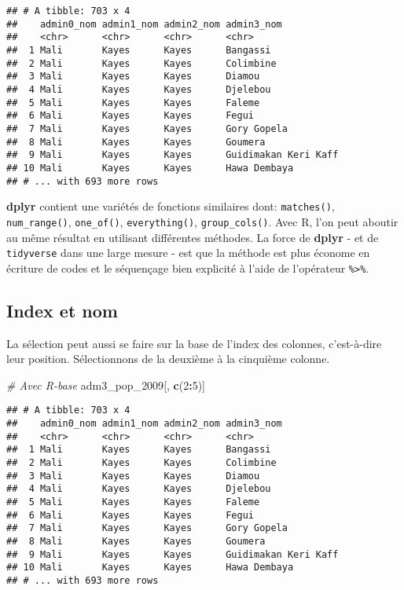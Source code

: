 \documentclass[]{book}
\newenvironment{Shaded}{\begin{snugshade}}{\end{snugshade}}
\newcommand{\KeywordTok}[1]{\textcolor[rgb]{0.13,0.29,0.53}{\textbf{#1}}}
\newcommand{\DecValTok}[1]{\textcolor[rgb]{0.00,0.00,0.81}{#1}}
\newcommand{\CommentTok}[1]{\textcolor[rgb]{0.56,0.35,0.01}{\textit{#1}}}
\newcommand{\OperatorTok}[1]{\textcolor[rgb]{0.81,0.36,0.00}{\textbf{#1}}}
\newcommand{\NormalTok}[1]{#1}
\begin{document}
\begin{verbatim}
## # A tibble: 703 x 4
##    admin0_nom admin1_nom admin2_nom admin3_nom          
##    <chr>      <chr>      <chr>      <chr>               
##  1 Mali       Kayes      Kayes      Bangassi            
##  2 Mali       Kayes      Kayes      Colimbine           
##  3 Mali       Kayes      Kayes      Diamou              
##  4 Mali       Kayes      Kayes      Djelebou            
##  5 Mali       Kayes      Kayes      Faleme              
##  6 Mali       Kayes      Kayes      Fegui               
##  7 Mali       Kayes      Kayes      Gory Gopela         
##  8 Mali       Kayes      Kayes      Goumera             
##  9 Mali       Kayes      Kayes      Guidimakan Keri Kaff
## 10 Mali       Kayes      Kayes      Hawa Dembaya        
## # ... with 693 more rows
\end{verbatim}

\textbf{dplyr} contient une variétés de fonctions similaires dont:
\texttt{matches()}, \texttt{num\_range()}, \texttt{one\_of()},
\texttt{everything()}, \texttt{group\_cols()}. Avec R, l'on peut aboutir
au même résultat en utilisant différentes méthodes. La force de
\textbf{dplyr} - et de \texttt{tidyverse} dans une large mesure - est
que la méthode est plus économe en écriture de codes et le séquençage
bien explicité à l'aide de l'opérateur \texttt{\%\textgreater{}\%}.

\subsection{Index et nom}\label{index-et-nom}

La sélection peut aussi se faire sur la base de l'index des colonnes,
c'est-à-dire leur position. Sélectionnons de la deuxième à la cinquième
colonne.

\begin{Shaded}
\begin{Highlighting}[]
\CommentTok{# Avec R-base}
\NormalTok{adm3_pop_}\DecValTok{2009}\NormalTok{[, }\KeywordTok{c}\NormalTok{(}\DecValTok{2}\OperatorTok{:}\DecValTok{5}\NormalTok{)]}
\end{Highlighting}
\end{Shaded}

\begin{verbatim}
## # A tibble: 703 x 4
##    admin0_nom admin1_nom admin2_nom admin3_nom          
##    <chr>      <chr>      <chr>      <chr>               
##  1 Mali       Kayes      Kayes      Bangassi            
##  2 Mali       Kayes      Kayes      Colimbine           
##  3 Mali       Kayes      Kayes      Diamou              
##  4 Mali       Kayes      Kayes      Djelebou            
##  5 Mali       Kayes      Kayes      Faleme              
##  6 Mali       Kayes      Kayes      Fegui               
##  7 Mali       Kayes      Kayes      Gory Gopela         
##  8 Mali       Kayes      Kayes      Goumera             
##  9 Mali       Kayes      Kayes      Guidimakan Keri Kaff
## 10 Mali       Kayes      Kayes      Hawa Dembaya        
## # ... with 693 more rows
\end{verbatim}
\end{document}
